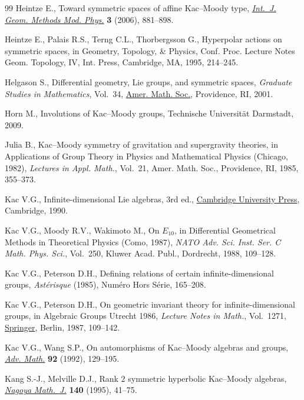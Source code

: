 \documentclass[pdftex]{sigma}
\numberwithin{equation}{section}
\begin{document}
\begin{thebibliography}{99}
Heintze E., Toward symmetric spaces of affine {K}ac--{M}oody type,
 \href{https://doi.org/10.1142/S0219887806001648}{\textit{Int.~J. Geom. Methods Mod. Phys.}} \textbf{3} (2006), 881--898.

Heintze E., Palais R.S., Terng C.L., Thorbergsson G., Hyperpolar actions on
 symmetric spaces, in Geometry, Topology, \& Physics, Conf. Proc. Lecture
 Notes Geom. Topology, IV, Int. Press, Cambridge, MA, 1995, 214--245.

Helgason S., Differential geometry, {L}ie groups, and symmetric spaces,
 \textit{Graduate Studies in Mathematics}, Vol.~34, \href{https://doi.org/10.1090/gsm/034}{Amer. Math. Soc.},
 Providence, RI, 2001.

Horn M., Involutions of {K}ac--{M}oody groups, {T}echnische {U}niversit\"at
 {D}armstadt, 2009.

Julia B., Kac--{M}oody symmetry of gravitation and supergravity theories, in
 Applications of Group Theory in Physics and Mathematical Physics ({C}hicago,
 1982), \textit{Lectures in Appl. Math.}, Vol.~21, Amer. Math. Soc.,
 Providence, RI, 1985, 355--373.

Kac V.G., Infinite-dimensional {L}ie algebras, 3rd ed., \href{https://doi.org/10.1017/CBO9780511626234}{Cambridge University
 Press}, Cambridge, 1990.

Kac V.G., Moody R.V., Wakimoto M., On {$E_{10}$}, in Differential Geometrical
 Methods in Theoretical Physics ({C}omo, 1987), \textit{NATO Adv. Sci. Inst.
 Ser. C Math. Phys. Sci.}, Vol.~250, Kluwer Acad. Publ., Dordrecht, 1988,
 109--128.

Kac V.G., Peterson D.H., Defining relations of certain infinite-dimensional
 groups, \textit{Ast\'erisque} (1985), Num\'ero Hors S\'erie, 165--208.

Kac V.G., Peterson D.H., On geometric invariant theory for infinite-dimensional
 groups, in Algebraic Groups {U}trecht 1986, \textit{Lecture Notes in Math.},
 Vol.~1271, \href{https://doi.org/10.1007/BFb0079235}{Springer}, Berlin, 1987, 109--142.

Kac V.G., Wang S.P., On automorphisms of {K}ac--{M}oody algebras and groups,
 \href{https://doi.org/10.1016/0001-8708(92)90063-Q}{\textit{Adv. Math.}} \textbf{92} (1992), 129--195.

Kang S.-J., Melville D.J., Rank {$2$} symmetric hyperbolic {K}ac--{M}oody
 algebras, \href{https://doi.org/10.1017/S0027763000005419}{\textit{Nagoya Math.~J.}} \textbf{140} (1995), 41--75.


\end{thebibliography}
\end{document}
